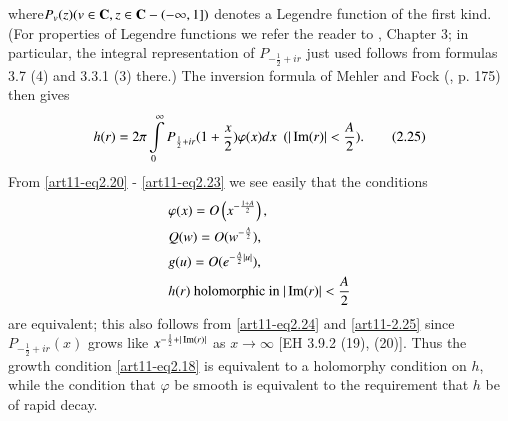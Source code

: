 where\pageoriginale $P_v (z) (v \in\mathbf{C}, z \in \mathbf{C} - (- \infty, 1])$
denotes a Legendre function of the first kind. (For properties of
Legendre functions we refer the reader to \cite{art11-EH}, Chapter 3;
in particular, the integral representation of $P_{-\frac{1}{2} + ir}$
just used follows from formulas 3.7 (4) and 3.3.1 (3) there.) The
inversion formula of Mehler and Fock (\cite{art11-EH}, p. 175) then gives 
\begin{equation*}
h(r) = 2 \pi \int\limits^\infty_0 P_{\frac{1}{2} +ir} (1+ \frac{x}{2}) \varphi (x) dx ~~ (|\operatorname{Im} (r) |<\frac{A}{2}).
\tag{2.25}\label{art11-eq2.25}
\end{equation*}
From \eqref{art11-eq2.20} - \eqref{art11-eq2.23} we see easily that the conditions 
\begin{align*}
& \varphi (x) = O \left(x^{-\frac{1+A}{2}} \right), \\
& Q (w) = O(w^{-\frac{A}{2}}), \\
& g (u) = O(e^{-\frac{A}{2}|u|}),\\
& h(r) \text{ holomorphic in } |\operatorname{Im} (r)| <\frac{A}{2}
\end{align*}
are equivalent; this also follows from \eqref{art11-eq2.24} and \eqref{art11-2.25} since $P_{-\frac{1}{2} + ir} (x)$ grows like $x^{-\frac{1}{2} + |\operatorname{Im} (r)|}$ as $x \to \infty$ [EH 3.9.2 (19), (20)]. Thus the growth condition \eqref{art11-eq2.18} is equivalent to a holomorphy condition on $h$, while the condition that $\varphi$ be smooth is equivalent to the requirement that $h$ be of rapid decay.


